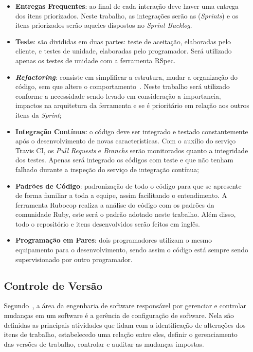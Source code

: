 \begin{itemize}
  \item \textbf{Entregas Frequentes}: ao final de cada interação deve haver uma entrega
    dos itens priorizados. Neste trabalho, as integrações serão as (\textit{Sprints})
    e os itens priorizados serão aqueles dispostos no \textit{Sprint Backlog}.
  \item \textbf{Teste}: são divididas em duas partes: teste de aceitação, elaboradas pelo cliente,
    e testes de unidade, elaboradas pelo programador. Será utilizado apenas os testes
    de unidade com a ferramenta RSpec.
  \item \textit{\textbf{Refactoring}}: consiste em simplificar a estrutura, mudar a organização do código,
    sem que altere o comportamento~\cite{beck:2000}. Neste trabalho será utilizado
    conforme a necessidade sendo levado em consideração a importancia, impactos na
    arquitetura da ferramenta e se é prioritário em relação aos outros itens da \textit{Sprint};
  \item \textbf{Integração Contínua}: o código deve ser integrado e testado constantemente
    após o desenvolvimento de novas características. Com o auxílio do serviço Travis CI,
    os \textit{Pull Requests} e \textit{Branchs} serão monitorados quanto a integridade dos testes. Apenas
    será integrado os códigos com teste e que não tenham falhado durante a
    inspeção do serviço de integração contínua;
  \item \textbf{Padrões de Código}: padronização de todo o código para que se apresente
    de forma familiar a toda a equipe, assim facilitando o entendimento. A ferramenta
    Rubocop realiza a análise do código com os padrões da comunidade Ruby, este será
    o padrão adotado neste trabalho. Além disso, todo o repositório e itens desenvolvidos
    serão feitos em inglês.
  \item \textbf{Programação em Pares}: dois programadores utilizam o mesmo equipamento para
    o desenvolvimento, sendo assim o código está sempre sendo supervisionado por
    outro programador.
\end{itemize}


\subsection{Controle de Versão}
\label{sec:ctrl_versao}

Segundo~, a área da engenharia de software responsável por
gerenciar e controlar mudanças em um software é a gerência de configuração de software.
Nela são definidas as principais atividades que lidam com a identificação de alterações
dos itens de trabalho, estabelecedo uma relação entre eles, definir o gerenciamento das
versões de trabalho, controlar e auditar as mudanças impostas.

